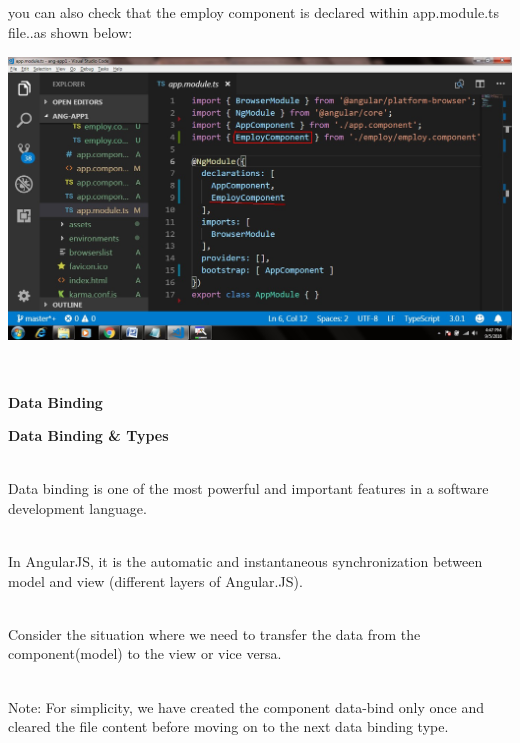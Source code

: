 \documentclass{article}
\begin{document}
\noindent  
\newpage
\noindent you can also check that the employ component is declared within app.module.ts file..as shown below:

\begin{center}
	\noindent \includegraphics*[width=5.26in, height=2.96in]{IMG-02-09}
\end{center}

\noindent  

\noindent  

\noindent 

 

\noindent 

\noindent 

\noindent 

\noindent 

\noindent 

\noindent \textbf{}
\\  
\newpage

{\Large \noindent \textbf{Data Binding }}
\\  
\noindent \textbf{}

{\large \noindent \textbf{Data Binding \& Types}}

\noindent 
\\  
\noindent Data binding is one of the most powerful and important features in a software development language.

\noindent 
\\  
\noindent In AngularJS, it is the automatic and instantaneous synchronization between model and view (different layers of Angular.JS).

\noindent 
\\  
\noindent Consider the situation where we need to transfer the data from the component(model) to the view or vice versa.

\noindent 
\\  
\noindent Note: For simplicity, we have created the component data-bind only once and cleared the file content before moving on to the next data binding type.
\end{document}
